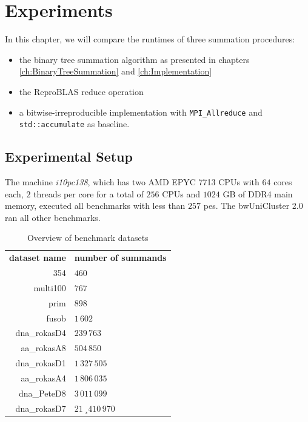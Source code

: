 \chapter{Experiments}
\label{ch:Experiments}

In this chapter, we will compare the runtimes of three summation procedures:
\begin{itemize}
  \item the binary tree summation algorithm as presented in chapters \ref{ch:BinaryTreeSummation} and \ref{ch:Implementation}
  \item the ReproBLAS reduce operation
  \item a bitwise-irreproducible implementation with \texttt{MPI\_Allreduce} and \texttt{std::accumulate} as baseline.
\end{itemize}

\section{Experimental Setup}
\label{sec:ExperimentalSetup}
The machine \textit{i10pc138}, which has two AMD EPYC 7713 CPUs with $64$ cores each, $2$ threads per core for a total of $256$ CPUs and $1024$ GB of DDR4 main memory, executed all benchmarks with less than $257$ \glspl{pe}.
The bwUniCluster 2.0 ran all other benchmarks.

\begin{table}
\centering
\begin{tabular}{r|l}
\textbf{dataset name} & \textbf{number of summands} \\
354 & $460$ \\
multi100 & $767$ \\
prim & $898$ \\
fusob & $1\,602$ \\
dna\_rokasD4 & $239\,763$ \\
aa\_rokasA8 & $504\,850$ \\
dna\_rokasD1 & $1\,327\,505$ \\
aa\_rokasA4 & $1\,806\,035$ \\
dna\_PeteD8 & $3\,011\,099$ \\
dna\_rokasD7 & $21\,¸410\,970$ \\
\end{tabular}
\caption{Overview of benchmark datasets}
\label{table:datasets}
\end{table}

